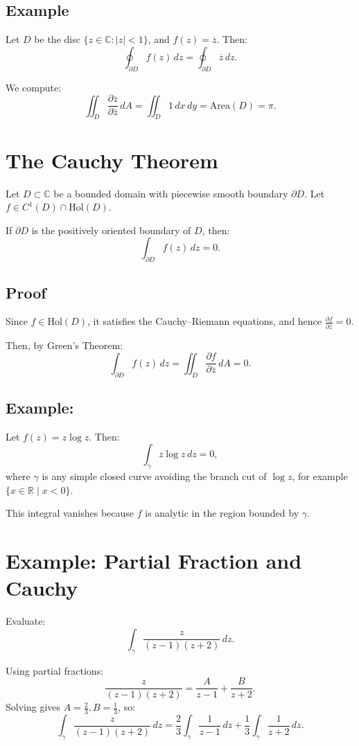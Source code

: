 \documentclass[12pt]{article}
\theoremstyle{definition} %
\theoremstyle{plain} %
\begin{document}
\subsection*{Example}

Let $D$ be the disc $\{z \in \mathbb{C} : |z| < 1\}$, and $f(z) = \overline{z}$. Then:
\[
\oint_{\partial D} f(z)\,dz = \oint_{\partial D} \overline{z}\,dz.
\]

We compute:
\[
\iint_D \frac{\partial \overline{z}}{\partial \overline{z}}\,dA = \iint_D 1\,dx\,dy = \text{Area}(D) = \pi.
\]
\section*{The Cauchy Theorem}

Let $D \subset \mathbb{C}$ be a bounded domain with piecewise smooth boundary $\partial D$. Let $f \in C^1(D) \cap \text{Hol}(D)$.

If $\partial D$ is the positively oriented boundary of $D$, then:
\[
\int_{\partial D} f(z)\,dz = 0.
\]

\subsection*{Proof}

Since $f \in \text{Hol}(D)$, it satisfies the Cauchy–Riemann equations, and hence $\frac{\partial f}{\partial \overline{z}} = 0$.

Then, by Green’s Theorem:
\[
\int_{\partial D} f(z)\,dz = \iint_D \frac{\partial f}{\partial \overline{z}}\,dA = 0.
\]

\subsection*{Example:}

Let $f(z) = z \log z$. Then:
\[
\int_{\gamma} z \log z\,dz = 0,
\]
where $\gamma$ is any simple closed curve avoiding the branch cut of $\log z$, for example $\{x \in \mathbb{R} \mid x < 0\}$.

This integral vanishes because $f$ is analytic in the region bounded by $\gamma$.

\section*{Example: Partial Fraction and Cauchy}

Evaluate:
\[
\int_{\gamma} \frac{z}{(z-1)(z+2)}\,dz.
\]

Using partial fractions:
\[
\frac{z}{(z-1)(z+2)} = \frac{A}{z - 1} + \frac{B}{z + 2}.
\]
Solving gives $A = \frac{2}{3}, B = \frac{1}{3}$, so:
\[
\int_{\gamma} \frac{z}{(z-1)(z+2)}\,dz = \frac{2}{3} \int_{\gamma} \frac{1}{z-1}\,dz + \frac{1}{3} \int_{\gamma} \frac{1}{z+2}\,dz.
\]
\end{document}
